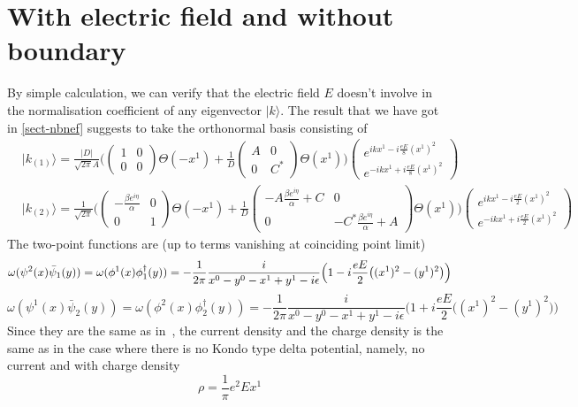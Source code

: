 \section{With electric field and without boundary}
By simple calculation, we can verify that the electric field $E$ doesn't involve in the normalisation coefficient of any eigenvector $ | k \rangle$. The result that we have got in \cref{sect-nbnef} suggests to take the orthonormal basis consisting of
\begin{equation}
\begin{split}
& | k_{(1)} \rangle = \frac{|D|}{\sqrt{2\pi}A}\bigg( \begin{pmatrix} 1 & 0 \\ 0 & 0 \end{pmatrix}
\Theta(-x^1) + 
\frac{1}{D}\begin{pmatrix} A & 0 \\  0 & C^* \end{pmatrix} \Theta(x^1) \bigg)
\begin{pmatrix} e^{ikx^1 - i\frac{eE}{8}(x^1)^2}  \\ e^{-ikx^1 + i\frac{eE}{8}(x^1)^2} \end{pmatrix}   \\
& | k_{(2)} \rangle = \frac{1}{\sqrt{2\pi}}
\Bigg( \begin{pmatrix} -\frac{\beta e^{i\eta}}{\alpha} & 0 \\ 0 & 1 \end{pmatrix}
\Theta(-x^1) + 
\frac{1}{D}\begin{pmatrix} -A\frac{\beta e^{i\eta}}{\alpha} + C  & 0\\ 0&  -C^*\frac{\beta e^{i\eta}}{\alpha} + A  \end{pmatrix} \Theta(x^1) \Bigg)
\begin{pmatrix} e^{ikx^1 -i\frac{eE}{2}(x^1)^2}  \\  e^{-ikx^1 +i\frac{eE}{2}(x^1)^2}  \end{pmatrix}  
\end{split}
\end{equation}
The two-point functions are (up to terms vanishing at coinciding point limit)
\begin{equation*}
\omega(\psi^2(x)\bar{\psi}_1(y)) =  \omega(\phi^1(x)\phi^\dagger_1(y)) \\ = -\frac{1}{2\pi}\frac{i}{x^0 - y^0 - x^1 + y^1 - i\epsilon} \Big(1 -  i\frac{eE}{2}\big((x^1)^2 - (y^1)^2 \big) \Big) 
\end{equation*}
\begin{equation*}
\omega(\psi^1(x)\bar{\psi}_2(y))   =  \omega(\phi^2(x)\phi^\dagger_2(y)) = -\frac{1}{2\pi}\frac{i}{x^0 - y^0 - x^1 + y^1 - i\epsilon} \Big(1 + i\frac{eE}{2}\big((x^1)^2 - (y^1)^2 \big) \Big)
\end{equation*}
Since they are the same as in~\cite{Zahn2015}, the current density and the charge density is the same as in the case where there is no Kondo type delta potential, namely, no current and with charge density 
\begin{equation}
\rho = \frac{1}{\pi} e^2 E x^1
\end{equation}
